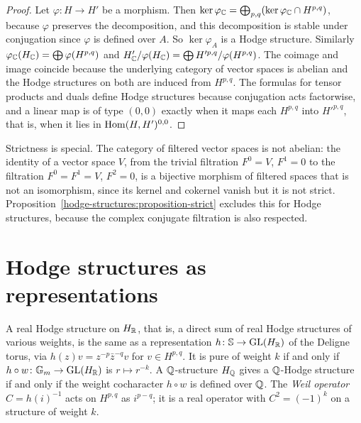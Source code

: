 \begin{proof}
Let $\varphi \colon H \to H'$ be a morphism. Then $\ker\varphi_{\mathbb{C}} = \bigoplus_{p,q}(\ker\varphi_{\mathbb{C}} \cap H^{p,q})$, because $\varphi$ preserves the decomposition, and this decomposition is
stable under conjugation since $\varphi$ is defined over $A$. So $\ker\varphi_A$ is a Hodge structure. Similarly $\varphi_{\mathbb{C}}(H_{\mathbb{C}}) = \bigoplus\varphi(H^{p,q})$ and
$H'_{\mathbb{C}}/\varphi(H_{\mathbb{C}}) = \bigoplus H'^{p,q}/\varphi(H^{p,q})$. The coimage and image coincide because the underlying category of vector spaces is abelian and the Hodge structures on both
are induced from $H^{p,q}$. The formulas for tensor products and duals define Hodge structures because conjugation acts factorwise, and a linear map is of type $(0,0)$ exactly when it
maps each $H^{p,q}$ into $H'^{p,q}$, that is, when it lies in $\operatorname{Hom}(H, H')^{0,0}$.
\end{proof}

\begin{counterexample}\label{hodge-structures:counterexample-filtered}
Strictness is special. The category of filtered vector spaces is not abelian: the identity of a vector space $V$, from the trivial filtration $F^0 = V$, $F^1 = 0$ to the filtration
$F^0 = F^1 = V$, $F^2 = 0$, is a bijective morphism of filtered spaces that is not an isomorphism, since its kernel and cokernel vanish but it is not strict. Proposition~\ref{hodge-structures:proposition-strict}
excludes this for Hodge structures, because the complex conjugate filtration is also respected.
\end{counterexample}

\section{Hodge structures as representations}\label{hodge-structures:section-representations}

\begin{proposition}\label{hodge-structures:proposition-deligne-torus}
A real Hodge structure on $H_{\mathbb{R}}$, that is, a direct sum of real Hodge structures of various weights, is the same as a representation $h \colon \mathbb{S} \to \mathrm{GL}(H_{\mathbb{R}})$ of the
Deligne torus, via $h(z)v = z^{-p}\bar z^{-q}v$ for $v \in H^{p,q}$. It is pure of weight $k$ if and only if $h \circ w \colon \mathbb{G}_m \to \mathrm{GL}(H_{\mathbb{R}})$ is $r \mapsto r^{-k}$. A $\mathbb{Q}$-structure
$H_{\mathbb{Q}}$ gives a $\mathbb{Q}$-Hodge structure if and only if the weight cocharacter $h \circ w$ is defined over $\mathbb{Q}$. The \emph{Weil operator} $C = h(i)^{-1}$ acts on $H^{p,q}$ as $i^{p-q}$; it is a real
operator with $C^2 = (-1)^k$ on a structure of weight $k$.
\end{proposition}

